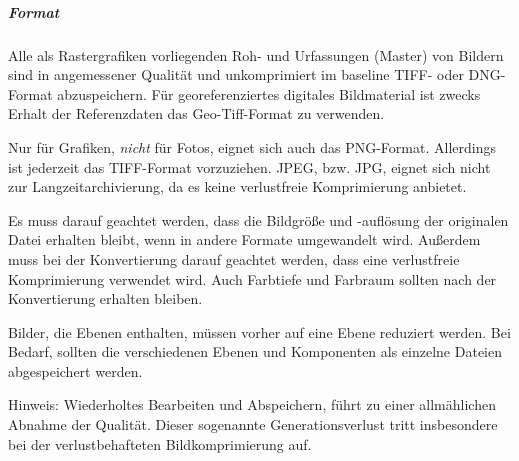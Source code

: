 \subparagraph{Format} Alle als Rastergrafiken vorliegenden Roh- und Urfassungen (Master) von Bildern sind in angemessener Qualität und unkomprimiert im baseline TIFF- oder DNG-Format abzuspeichern. Für georeferenziertes digitales Bildmaterial ist zwecks Erhalt der Referenzdaten das Geo-Tiff-Format zu verwenden.

Nur für Grafiken, \emph{nicht} für Fotos, eignet sich auch das PNG-Format. Allerdings ist jederzeit das TIFF-Format vorzuziehen. JPEG, bzw. JPG, eignet sich nicht zur Langzeitarchivierung, da es keine verlustfreie Komprimierung anbietet.

Es muss darauf geachtet werden, dass die Bildgröße und -auflösung der originalen Datei erhalten bleibt, wenn in andere Formate umgewandelt wird. Außerdem muss bei der Konvertierung darauf geachtet werden, dass eine verlustfreie Komprimierung verwendet wird. Auch Farbtiefe und Farbraum sollten nach der Konvertierung erhalten bleiben.

Bilder, die Ebenen enthalten, müssen vorher auf eine Ebene reduziert werden. Bei Bedarf, sollten die verschiedenen Ebenen und Komponenten als einzelne Dateien abgespeichert werden. 


Hinweis: Wiederholtes Bearbeiten und Abspeichern, führt zu einer allmählichen Abnahme der Qualität. Dieser sogenannte Generationsverlust tritt insbesondere bei der verlustbehafteten Bildkomprimierung auf.

